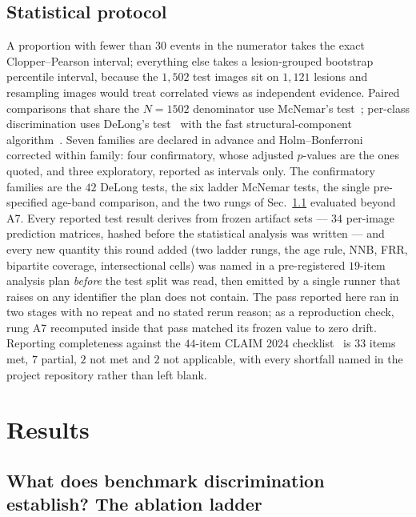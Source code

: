 \documentclass[journal]{IEEEtran}
\begin{document}
\subsection{Statistical protocol}
\label{sec:frozen}
A proportion with fewer than $30$ events in the numerator takes the exact Clopper--Pearson
interval; everything else takes a lesion-grouped bootstrap percentile interval, because the
$1{,}502$ test images sit on $1{,}121$ lesions and resampling images would treat correlated
views as independent evidence. Paired comparisons that share the $N=1502$ denominator use
McNemar's test~\cite{dietterich1998}; per-class discrimination uses DeLong's
test~\cite{delong1988} with the fast structural-component algorithm~\cite{sun2014fastdelong}.
Seven families are declared in advance and Holm--Bonferroni corrected within family: four
confirmatory, whose adjusted $p$-values are the ones quoted, and three exploratory, reported as
intervals only. The confirmatory families are the $42$ DeLong tests, the six ladder McNemar
tests, the single pre-specified age-band comparison, and the two rungs of
Sec.~\ref{sec:results-ladder} evaluated beyond A7. Every reported test result derives from
frozen artifact sets --- $34$ per-image prediction matrices, hashed before the statistical
analysis was written --- and every new quantity this round added (two ladder rungs, the age
rule, NNB, FRR, bipartite coverage, intersectional cells) was named in a pre-registered
$19$-item analysis plan \emph{before} the test split was read, then emitted by a single runner
that raises on any identifier the plan does not contain. The pass reported here ran in two
stages with no repeat and no stated rerun reason; as a reproduction check, rung A7 recomputed
inside that pass matched its frozen value to zero drift. Reporting completeness against the
$44$-item CLAIM 2024 checklist~\cite{tejani2024claim} is $33$ items met, $7$ partial, $2$ not
met and $2$ not applicable, with every shortfall named in the project repository rather than
left blank.

\section{Results}

\subsection{What does benchmark discrimination establish? The ablation ladder}
\label{sec:results-ladder}
\end{document}
